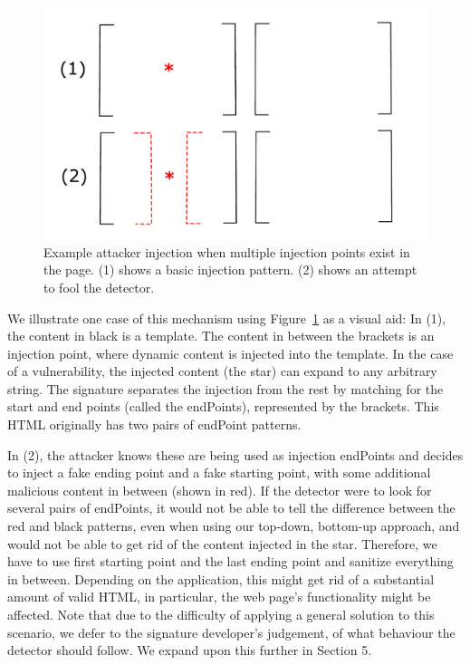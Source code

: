\begin{figure}[h]
	\includegraphics[scale=0.25]{img/attacker_injection_compound.pdf}
	\caption{Example attacker injection when multiple injection points exist in the page. (1) shows a basic injection pattern. (2) shows an attempt to fool the detector.}
	\label{fig:attacker_injection}
\end{figure}



We illustrate one case of this mechanism using Figure~\ref{fig:attacker_injection} as a visual aid: In (1), the content in black is a template. The content in between the brackets is an injection point, where dynamic content is injected into the template. In the case of a vulnerability, the injected content (the star) can expand to any arbitrary string. The signature separates the injection from the rest by matching for the start and end points (called the endPoints), represented by the brackets. This HTML originally has two pairs of endPoint patterns.

In (2), the attacker knows these are being used as injection endPoints and decides to inject a fake ending point and a fake starting point, with some additional malicious content in between (shown in red). If the detector were to look for several pairs of endPoints, it would not be able to tell the difference between the red and black patterns, even when using our top-down, bottom-up approach, and would not be able to get rid of the content injected in the star. Therefore, we have to use first starting point and the last ending point and sanitize everything in between. Depending on the application, this might get rid of a substantial amount of valid HTML, in particular, the web page's functionality might be affected. Note that due to the difficulty of applying a general solution to this scenario, we defer to the signature developer's judgement, of what behaviour the detector should follow. We expand upon this further in Section 5.


